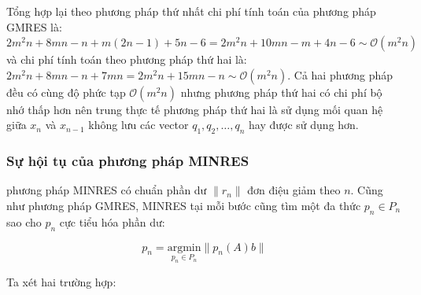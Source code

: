 \documentclass[14pt, a4paper]{article}
\numberwithin{equation}{section}
\numberwithin{algorithm}{section}
\numberwithin{figure}{section}
\numberwithin{dl}{section}
\numberwithin{md}{section}
\numberwithin{bd}{section}
\numberwithin{dn}{section}
\numberwithin{hq}{section}
\begin{document}
Tổng hợp lại theo phương pháp thứ nhất chi phí tính toán của phương pháp GMRES là: $2m^2n+8mn-n+m(2n-1)+5n-6=2m^2n+10mn-m+4n-6 \sim \mathcal{O}(m^2n)$ và chi phí tính toán theo phương pháp thứ hai là: $2m^2n+8mn-n + 7mn=2m^2n+15mn-n \sim \mathcal{O}(m^2n)$. Cả hai phương pháp đều có cùng độ phức tạp $\mathcal{O}(m^2n)$ nhưng phương pháp thứ hai có chi phí bộ nhớ thấp hơn nên trung thực tế phương pháp thứ hai là sử dụng mối quan hệ giữa $x_n$ và $x_{n-1}$ không lưu các vector $q_1, q_2, \dots, q_n$ hay được sử dụng hơn.

\subsubsection{Sự hội tụ của phương pháp MINRES}

phương pháp MINRES có chuẩn phần dư $\lVert r_n \rVert $ đơn điệu giảm theo $n$. Cũng như phương pháp GMRES, MINRES tại mỗi bước cũng tìm một đa thức $p_n \in P_n$ sao cho $p_n$ cực tiểu hóa phần dư:

\begin{equation}
    p_n = \underset{p_n \in P_n}{\mathrm{argmin}} \lVert p_n(A)b \rVert
\end{equation}

Ta xét hai trường hợp:
\end{document}
